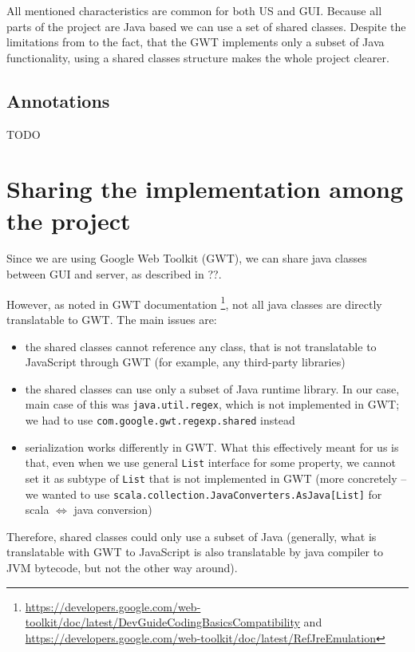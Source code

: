 All mentioned characteristics are common for both US and GUI. Because all parts of the project are Java based we can use a set of shared classes. Despite the limitations from to the fact, that the GWT implements only a subset of Java functionality, using a shared classes structure makes the whole project clearer. 

\subsection*{Annotations}

TODO 


\section{Sharing the implementation among the project}

Since we are using Google Web Toolkit (GWT), we can share java classes between GUI and server, as described in ??.

However, as noted in GWT documentation \footnote{\url{https://developers.google.com/web-toolkit/doc/latest/DevGuideCodingBasicsCompatibility} and \url{https://developers.google.com/web-toolkit/doc/latest/RefJreEmulation}}, not all java classes are directly translatable to GWT. The main issues are:

\begin{itemize}
\item the shared classes cannot reference any class, that is not translatable to JavaScript through GWT (for example, any third-party libraries)
\item the shared classes can use only a subset of Java runtime library. In our case, main case of this was \texttt{java.util.regex}, which is not implemented in GWT; we had to use \texttt{com.google.gwt.regexp.shared} instead
\item serialization works differently in GWT. What this effectively meant for us is that, even when we use general \texttt{List} interface for some property, we cannot set it as subtype of \texttt{List} that is not implemented in GWT (more concretely -- we wanted to use \texttt{scala.collection.JavaConverters.AsJava[List]} for scala $\Leftrightarrow$ java conversion)
\end{itemize}

Therefore, shared classes could only use a subset of Java (generally, what is translatable with GWT to JavaScript is also translatable by java compiler to JVM bytecode, but not the other way around).
